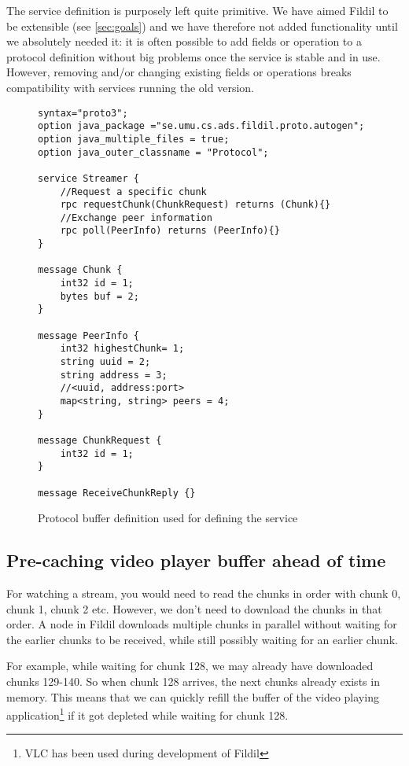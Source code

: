 \documentclass[10pt, a4paper]{article}
\begin{document}
The service definition is purposely left quite primitive. We have
aimed Fildil to be extensible (see \autoref{sec:goals}) and we have
therefore not added functionality until we absolutely needed it: it is
often possible to add fields or operation to a protocol definition
without big problems once the service is stable and in use. However,
removing and/or changing existing fields or operations breaks
compatibility with services running the old version.

\begin{figure}[H]
\begin{verbatim}
syntax="proto3";
option java_package ="se.umu.cs.ads.fildil.proto.autogen";
option java_multiple_files = true;
option java_outer_classname = "Protocol";

service Streamer {
    //Request a specific chunk
    rpc requestChunk(ChunkRequest) returns (Chunk){}
    //Exchange peer information
    rpc poll(PeerInfo) returns (PeerInfo){}
}

message Chunk {
    int32 id = 1;
    bytes buf = 2;
}

message PeerInfo {
    int32 highestChunk= 1;
    string uuid = 2;
    string address = 3;
    //<uuid, address:port>
    map<string, string> peers = 4;
}

message ChunkRequest {
    int32 id = 1;
}

message ReceiveChunkReply {}
\end{verbatim}
\caption{Protocol buffer definition used for defining the service}
\label{fig:protobuf}
\end{figure}

\subsection{Pre-caching video player buffer ahead of time}
\label{sec:filling-buffers}

For watching a stream, you would need to read the chunks in order with chunk 0,
chunk 1, chunk 2 etc. However, we don't need to download the chunks in that
order. A node in Fildil downloads multiple chunks in parallel without waiting
for the earlier chunks to be received, while still possibly waiting for an
earlier chunk.

For example, while waiting for chunk 128, we may already have downloaded chunks
129-140. So when chunk 128 arrives, the next chunks already exists in
memory. This means that we can quickly refill the buffer of the video playing
application\footnote{VLC has been used during development of Fildil} if it got
depleted while waiting for chunk 128.
\end{document}
